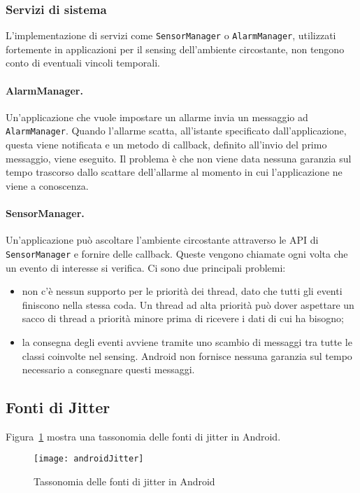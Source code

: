 \subsubsection{Servizi di sistema}
L'implementazione di servizi come \texttt{SensorManager} o \texttt{AlarmManager}, utilizzati fortemente in applicazioni per il sensing dell'ambiente circostante, non tengono conto di eventuali vincoli temporali. 

\paragraph{AlarmManager.} Un'applicazione che vuole impostare un allarme invia un messaggio ad \texttt{AlarmManager}. Quando l'allarme scatta, all'istante specificato dall'applicazione, questa viene notificata e un metodo di callback, definito all'invio del primo messaggio, viene eseguito. Il problema è che non viene data nessuna garanzia sul tempo trascorso dallo scattare dell'allarme al momento in cui l'applicazione ne viene a conoscenza. 

\paragraph{SensorManager.}
Un'applicazione può ascoltare l'ambiente circostante attraverso le API di \texttt{SensorManager} e fornire delle callback. Queste vengono chiamate ogni volta che un evento di interesse si verifica. Ci sono due principali problemi: 
\begin{itemize}
	\item non c'è nessun supporto per le priorità dei thread, dato che tutti gli eventi finiscono nella stessa coda. Un thread ad alta priorità può dover aspettare un sacco di thread a priorità minore prima di ricevere i dati di cui ha bisogno;
	\item la consegna degli eventi avviene tramite uno scambio di messaggi tra tutte le classi coinvolte nel sensing. Android non fornisce nessuna garanzia sul tempo necessario a consegnare questi messaggi.
\end{itemize}

\subsection{Fonti di Jitter}
Figura~\ref{fig:androidjitter} mostra una tassonomia delle fonti di jitter in Android. 
\begin{figure}[h]
	\centering
	\texttt{[image: androidJitter]}
	\caption{Tassonomia delle fonti di jitter in Android}
	\label{fig:androidjitter}
\end{figure}

